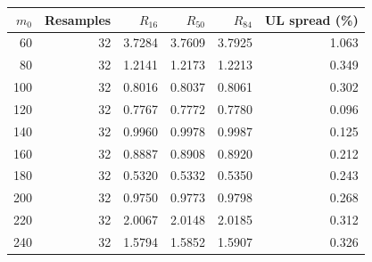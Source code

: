 \begin{tabular}{rrrrrr}
\toprule
$m_0$ & Resamples & $R_{16}$ & $R_{50}$ & $R_{84}$ & UL spread (\%) \\
\midrule
60 & 32 & 3.7284 & 3.7609 & 3.7925 & 1.063 \\
80 & 32 & 1.2141 & 1.2173 & 1.2213 & 0.349 \\
100 & 32 & 0.8016 & 0.8037 & 0.8061 & 0.302 \\
120 & 32 & 0.7767 & 0.7772 & 0.7780 & 0.096 \\
140 & 32 & 0.9960 & 0.9978 & 0.9987 & 0.125 \\
160 & 32 & 0.8887 & 0.8908 & 0.8920 & 0.212 \\
180 & 32 & 0.5320 & 0.5332 & 0.5350 & 0.243 \\
200 & 32 & 0.9750 & 0.9773 & 0.9798 & 0.268 \\
220 & 32 & 2.0067 & 2.0148 & 2.0185 & 0.312 \\
240 & 32 & 1.5794 & 1.5852 & 1.5907 & 0.326 \\
\bottomrule
\end{tabular}
